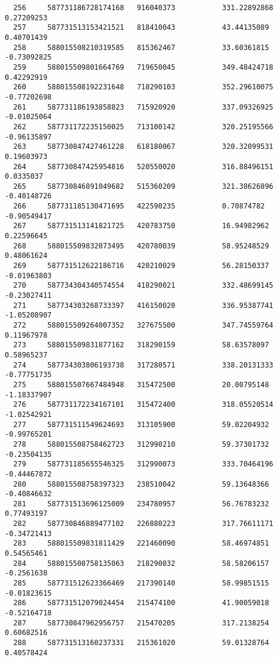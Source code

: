 \documentclass[a4paper,11pt]{article}
\begin{document}
\begin{verbatim}
  256     587731186728174168   916040373           331.22892868   0.27209253   
  257     587731513153421521   818410043           43.44135089    0.40701439   
  258     588015508210319585   815362467           33.60361815    -0.73092825  
  259     588015509801664769   719650045           349.48424718   0.42292919   
  260     588015508192231648   718290103           352.29610075   -0.77202698  
  261     587731186193858823   715920920           337.09326925   -0.01025064  
  262     587731172235150025   713100142           320.25195566   -0.96135897  
  263     587730847427461228   618180067           320.32099531   0.19603973   
  264     587730847425954816   520550020           316.88496151   0.0335037    
  265     587730846891049682   515360209           321.38626896   -0.40148726  
  266     587731185130471695   422590235           0.70874782     -0.90549417  
  267     587731513141821725   420783750           16.94982962    0.22596645   
  268     588015509832073495   420780039           58.95248529    0.48061624   
  269     587731512622186716   420210029           56.28150337    -0.01963803  
  270     587734304340574554   418290021           332.48699145   -0.23027411  
  271     587734303268733397   416150020           336.95387741   -1.05208907  
  272     588015509264007352   327675500           347.74559764   0.11967978   
  273     588015509831877162   318290159           58.63578097    0.58965237   
  274     587734303806193738   317280571           338.20131333   -0.77751735  
  275     588015507667484948   315472500           20.00795148    -1.18337907  
  276     587731172234167101   315472400           318.05520514   -1.02542921  
  277     587731511549624693   313105900           59.02204932    -0.99765201  
  278     588015508758462723   312990210           59.37301732    -0.23504135  
  279     587731185655546325   312990073           333.70464196   -0.44467872  
  280     588015508758397323   238510042           59.13648366    -0.40846632  
  281     587731513696125009   234780957           56.76783232    0.77493197   
  282     587730846889477102   226880223           317.76611171   -0.34721413  
  283     588015509831811429   221460090           58.46974851    0.54565461   
  284     588015508758135063   218290032           58.58206157    -0.2561638   
  285     587731512623366469   217390140           58.99851515    -0.01823615  
  286     587731512079024454   215474100           41.90059018    -0.52164718  
  287     587730847962956757   215470205           317.2138254    0.60682516   
  288     587731513160237331   215361020           59.01328764    0.40578424   

\end{verbatim}
\end{document}
